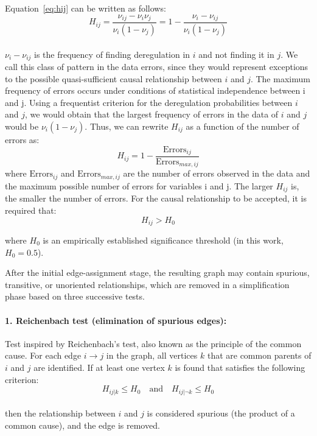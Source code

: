 \documentclass[12pt,a4paper]{report}
\begin{document}
\begin{enumerate}
	
	Equation~\ref{eq:hij} can be written as follows:
	\begin{equation}
	H_{ij} = \frac{\nu_{ij} - \nu_i \nu_j}{\nu_i (1 - \nu_j)}= 1 - \frac{\nu_i - \nu_{ij}}{\nu_i (1 - \nu_j)}
	\end{equation}
\\
$\nu_i - \nu_{ij}$ is the frequency of finding deregulation in $i$ and not finding it in $j$. We call this class of pattern in the data errors, since they would represent exceptions to the possible quasi-sufficient causal relationship between $i$ and $j$. The maximum frequency of errors occurs under conditions of statistical independence between i and j. Using a frequentist criterion for the deregulation probabilities between $i$ and $j$, we would obtain that the largest frequency of errors in the data of $i$ and $j$ would be $\nu_i (1 - \nu_j)$. Thus, we can rewrite $H_{ij}$ as a function of the number of errors as:
\begin{equation}
H_{ij} = 1 - \frac{ \mathrm{Errors}_{ij} }{ \mathrm{Errors}_{max,ij} }
\end{equation}
where $\mathrm{Errors}_{ij}$ and $\mathrm{Errors}_{max,ij}$ are the number of errors observed in the data and the maximum possible number of errors for variables i and j. The larger $H_{ij}$ is, the smaller the number of errors. For the causal relationship to be accepted, it is required that:
\begin{equation}
\label{eq:loev}
H_{ij} > H_0
\end{equation}    

    where \( H_0 \) is an empirically established significance threshold (in this work, \( H_0 = 0.5 \)).
\end{enumerate}


After the initial edge-assignment stage, the resulting graph may contain spurious, transitive, or unoriented relationships, which are removed in a simplification phase based on three successive tests.

\paragraph{1. Reichenbach test (elimination of spurious edges):}
Test inspired by Reichenbach’s test, also known as the principle of the common cause\cite{reichenbach}. For each edge \( i \to j \) in the graph, all vertices \( k \) that are common parents of \( i \) and \( j \) are identified. If at least one vertex \( k \) is found that satisfies the following criterion:
\begin{equation}
\label{eq:reichenbach}
H_{ij|k} \leq H_0 \quad \text{and} \quad H_{ij|\neg k} \leq H_0 
\end{equation}
\\
then the relationship between \( i \) and \( j \) is considered spurious (the product of a common cause), and the edge is removed.
\end{document}
